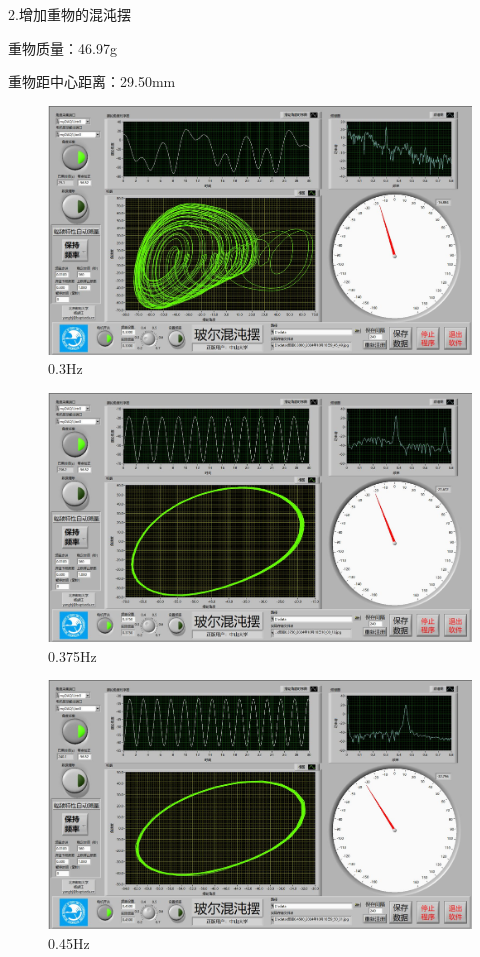\documentclass[dvipsnames, svgnames,a4paper,11pt]{article}
\begin{document}
2.增加重物的混沌摆

重物质量：46.97g

重物距中心距离：29.50mm
\begin{figure}[H]
	\includegraphics[width=\textwidth]{姚昊廷22322091/0.3Hz加重物.jpg}
	\caption{0.3Hz}
\end{figure}

\begin{figure}[H]
	\includegraphics[width=\textwidth]{姚昊廷22322091/0.375Hz加重物.jpg}
	\caption{0.375Hz}
\end{figure}

\begin{figure}[H]
	\includegraphics[width=\textwidth]{姚昊廷22322091/0.45Hz加重物.jpg}
	\caption{0.45Hz}
\end{figure}
\end{document}
